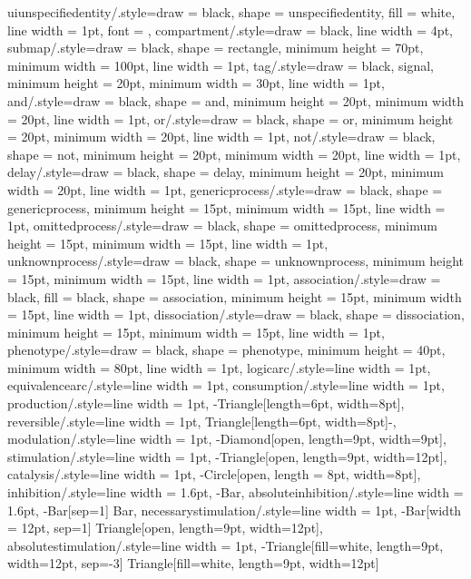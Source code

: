 {    uiunspecifiedentity/.style={draw = black, shape = unspecifiedentity, fill = white, line width = 1pt, font = {\tiny\sffamily}},
    compartment/.style={draw = black, line width = 4pt},
    submap/.style={draw = black, shape = rectangle, minimum height = 70pt, minimum width = 100pt, line width = 1pt},
    tag/.style={draw = black, signal, minimum height = 20pt, minimum width = 30pt, line width = 1pt},
    and/.style={draw = black, shape = and, minimum height = 20pt, minimum width = 20pt, line width = 1pt},
    or/.style={draw = black, shape = or, minimum height = 20pt, minimum width = 20pt, line width = 1pt},
    not/.style={draw = black, shape = not, minimum height = 20pt, minimum width = 20pt, line width = 1pt},
    delay/.style={draw = black, shape = delay, minimum height = 20pt, minimum width = 20pt, line width = 1pt},
    genericprocess/.style={draw = black, shape = genericprocess, minimum height = 15pt, minimum width = 15pt, line width = 1pt},
    omittedprocess/.style={draw = black, shape = omittedprocess, minimum height = 15pt, minimum width = 15pt, line width = 1pt},
    unknownprocess/.style={draw = black, shape = unknownprocess, minimum height = 15pt, minimum width = 15pt, line width = 1pt},
    association/.style={draw = black, fill = black, shape = association, minimum height = 15pt, minimum width = 15pt, line width = 1pt},
    dissociation/.style={draw = black, shape = dissociation, minimum height = 15pt, minimum width = 15pt, line width = 1pt},
    phenotype/.style={draw = black, shape = phenotype, minimum height = 40pt, minimum width = 80pt, line width = 1pt},
    logicarc/.style={line width = 1pt},
    equivalencearc/.style={line width = 1pt},
    consumption/.style={line width = 1pt},
    production/.style={line width = 1pt, -{Triangle[length=6pt, width=8pt]}},
    reversible/.style={line width = 1pt, {Triangle[length=6pt, width=8pt]}-},
    modulation/.style={line width = 1pt, -{Diamond[open, length=9pt, width=9pt]}},
    stimulation/.style={line width = 1pt, -{Triangle[open, length=9pt, width=12pt]}},
    catalysis/.style={line width = 1pt, -{Circle[open, length = 8pt, width=8pt]}},
    inhibition/.style={line width = 1.6pt, -{Bar}},
    absoluteinhibition/.style={line width = 1.6pt, -{Bar[sep=1] Bar}},
    necessarystimulation/.style={line width = 1pt, -{Bar[width = 12pt, sep=1] Triangle[open, length=9pt, width=12pt]}},
    absolutestimulation/.style={line width = 1pt, -{Triangle[fill=white, length=9pt, width=12pt, sep=-3] Triangle[fill=white, length=9pt, width=12pt]}}}

